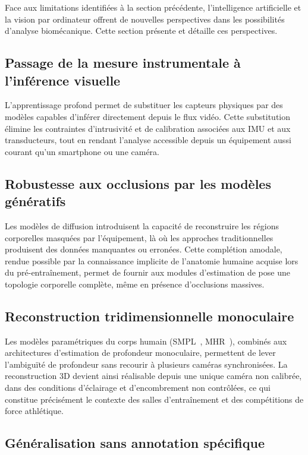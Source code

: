 Face aux limitations identifiées à la section précédente, l'intelligence artificielle et la vision par ordinateur offrent de nouvelles perspectives dans les possibilités d'analyse biomécanique. Cette section présente et détaille ces perspectives.

\subsection{Passage de la mesure instrumentale à l'inférence visuelle}

L'apprentissage profond permet de substituer les capteurs physiques par des modèles capables d'inférer directement depuis le flux vidéo. Cette substitution élimine les contraintes d'intrusivité et de calibration associées aux IMU et aux transducteurs, tout en rendant l'analyse accessible depuis un équipement aussi courant qu'un smartphone ou une caméra.

\subsection{Robustesse aux occlusions par les modèles génératifs}

Les modèles de diffusion introduisent la capacité de reconstruire les régions corporelles masquées par l'équipement, là où les approches traditionnelles produisent des données manquantes ou erronées. Cette complétion amodale, rendue possible par la connaissance implicite de l'anatomie humaine acquise lors du pré-entraînement, permet de fournir aux modules d'estimation de pose une topologie corporelle complète, même en présence d'occlusions massives.

\subsection{Reconstruction tridimensionnelle monoculaire}

Les modèles paramétriques du corps humain (SMPL~\cite{SMPL-2015}, MHR~\cite{MHR-2025}), combinés aux architectures d'estimation de profondeur monoculaire, permettent de lever l'ambiguïté de profondeur sans recourir à plusieurs caméras synchronisées. La reconstruction 3D devient ainsi réalisable depuis une unique caméra non calibrée, dans des conditions d'éclairage et d'encombrement non contrôlées, ce qui constitue précisément le contexte des salles d'entraînement et des compétitions de force athlétique.

\subsection{Généralisation sans annotation spécifique}

